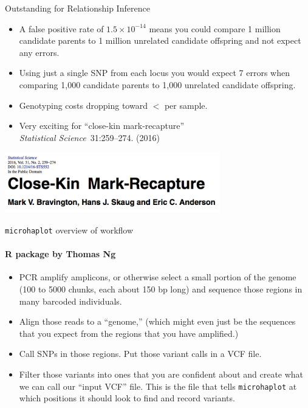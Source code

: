 \documentclass[letter,graphicx]{beamer}
\begin{document}
\begin{frame}{Outstanding for Relationship Inference}
\begin{itemize}
\item A false positive rate of $1.5 \times 10^{-14}$ means you could compare 1 million candidate parents to 1 million unrelated candidate offspring and not expect any errors.
\item Using just a single SNP from each locus you would expect 7 errors when comparing 1,000 candidate parents to 1,000 unrelated candidate offspring.
\item Genotyping costs dropping toward $<$ per sample.
\item Very exciting for ``close-kin mark-recapture''\\
{\em Statistical Science}~31:259--274. (2016)
\end{itemize}
\begin{center}
\includegraphics[width = 0.7\textwidth]{mhap_figs/ckmr-header.png}
\end{center}
\end{frame}







\begin{frame}{{\tt microhaplot} overview of workflow}
\framesubtitle{R package by Thomas Ng}

\begin{itemize}
\item PCR amplify amplicons, or otherwise select a small portion of the genome (100 to 5000 chunks, each about 150 bp long) and sequence those
regions in many barcoded individuals.
\item Align those reads to a ``genome,'' (which might even just be the sequences that you expect from the regions that you have amplified.)
\item Call SNPs in those regions.  Put those variant calls in a VCF file.
\item Filter those variants into ones that you are confident about and create what we can call
our ``input VCF'' file.  This is the file that tells {\tt microhaplot} at which positions it should look to
find and record variants.  

\end{itemize}
\end{frame}
\end{document}
